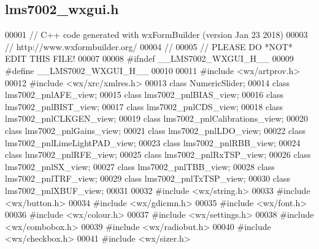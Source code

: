 \subsection{lms7002\+\_\+wxgui.\+h}
\label{lms7002__wxgui_8h_source}

\begin{DoxyCode}
00001 \textcolor{comment}{// C++ code generated with wxFormBuilder (version Jan 23 2018)}
00003 \textcolor{comment}{// http://www.wxformbuilder.org/}
00004 \textcolor{comment}{//}
00005 \textcolor{comment}{// PLEASE DO *NOT* EDIT THIS FILE!}
00007 \textcolor{comment}{}
00008 \textcolor{preprocessor}{#ifndef \_\_LMS7002\_WXGUI\_H\_\_}
00009 \textcolor{preprocessor}{#define \_\_LMS7002\_WXGUI\_H\_\_}
00010 
00011 \textcolor{preprocessor}{#include <wx/artprov.h>}
00012 \textcolor{preprocessor}{#include <wx/xrc/xmlres.h>}
00013 \textcolor{keyword}{class }NumericSlider;
00014 \textcolor{keyword}{class }lms7002_pnlAFE_view;
00015 \textcolor{keyword}{class }lms7002_pnlBIAS_view;
00016 \textcolor{keyword}{class }lms7002_pnlBIST_view;
00017 \textcolor{keyword}{class }lms7002_pnlCDS_view;
00018 \textcolor{keyword}{class }lms7002_pnlCLKGEN_view;
00019 \textcolor{keyword}{class }lms7002_pnlCalibrations_view;
00020 \textcolor{keyword}{class }lms7002_pnlGains_view;
00021 \textcolor{keyword}{class }lms7002_pnlLDO_view;
00022 \textcolor{keyword}{class }lms7002_pnlLimeLightPAD_view;
00023 \textcolor{keyword}{class }lms7002_pnlRBB_view;
00024 \textcolor{keyword}{class }lms7002_pnlRFE_view;
00025 \textcolor{keyword}{class }lms7002_pnlRxTSP_view;
00026 \textcolor{keyword}{class }lms7002_pnlSX_view;
00027 \textcolor{keyword}{class }lms7002_pnlTBB_view;
00028 \textcolor{keyword}{class }lms7002_pnlTRF_view;
00029 \textcolor{keyword}{class }lms7002_pnlTxTSP_view;
00030 \textcolor{keyword}{class }lms7002_pnlXBUF_view;
00031 
00032 \textcolor{preprocessor}{#include <wx/string.h>}
00033 \textcolor{preprocessor}{#include <wx/button.h>}
00034 \textcolor{preprocessor}{#include <wx/gdicmn.h>}
00035 \textcolor{preprocessor}{#include <wx/font.h>}
00036 \textcolor{preprocessor}{#include <wx/colour.h>}
00037 \textcolor{preprocessor}{#include <wx/settings.h>}
00038 \textcolor{preprocessor}{#include <wx/combobox.h>}
00039 \textcolor{preprocessor}{#include <wx/radiobut.h>}
00040 \textcolor{preprocessor}{#include <wx/checkbox.h>}
00041 \textcolor{preprocessor}{#include <wx/sizer.h>}

\end{DoxyCode}
